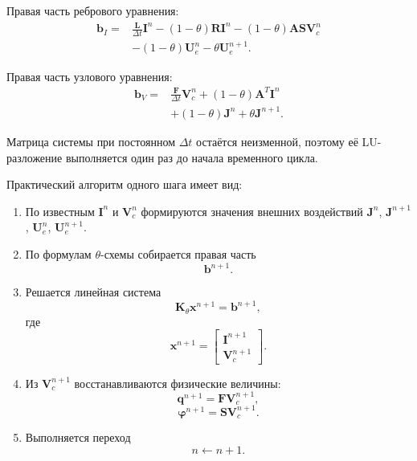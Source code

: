 \documentclass[12pt,a4paper]{article}
\newcommand{\vect}[1]{\boldsymbol{#1}}
\newcommand{\matr}[1]{\mathbf{#1}}
\begin{document}
Правая часть ребрового уравнения:
\begin{align}
\vect b_I
={}&
\frac{\matr L}{\Delta t}\vect I^n
-
(1-\theta)\matr R\vect I^n
-
(1-\theta)\matr A\matr S\vect V_c^n
\nonumber\\
&-
(1-\theta)\vect U_e^n
-
\theta\vect U_e^{n+1}.
\end{align}

Правая часть узлового уравнения:
\begin{align}
\vect b_V
={}&
\frac{\matr F}{\Delta t}\vect V_c^n
+
(1-\theta)\matr A^T\vect I^n
\nonumber\\
&+
(1-\theta)\vect J^n
+
\theta\vect J^{n+1}.
\end{align}

Матрица системы при постоянном $\Delta t$ остаётся неизменной,
поэтому её LU-разложение выполняется один раз до начала временного цикла.

Практический алгоритм одного шага имеет вид:
\begin{enumerate}[label=\arabic*.]
    \item По известным $\vect I^n$ и $\vect V_c^n$ формируются
    значения внешних воздействий $\vect J^n$, $\vect J^{n+1}$,
    $\vect U_e^n$, $\vect U_e^{n+1}$.

    \item По формулам $\theta$-схемы собирается правая часть
    \begin{equation}
        \vect b^{n+1}.
    \end{equation}

    \item Решается линейная система
    \begin{equation}
        \matr K_\theta
        \vect x^{n+1}
        =
        \vect b^{n+1},
    \end{equation}
    где
    \begin{equation}
        \vect x^{n+1}
        =
        \begin{bmatrix}
            \vect I^{n+1}\\
            \vect V_c^{n+1}
        \end{bmatrix}.
    \end{equation}

    \item Из $\vect V_c^{n+1}$ восстанавливаются физические величины:
    \begin{equation}
        \vect q^{n+1}
        =
        \matr F\vect V_c^{n+1},
    \end{equation}
    \begin{equation}
        \vect\varphi^{n+1}
        =
        \matr S\vect V_c^{n+1}.
    \end{equation}

    \item Выполняется переход
    \begin{equation}
        n\leftarrow n+1.
    \end{equation}
\end{enumerate}
\end{document}
